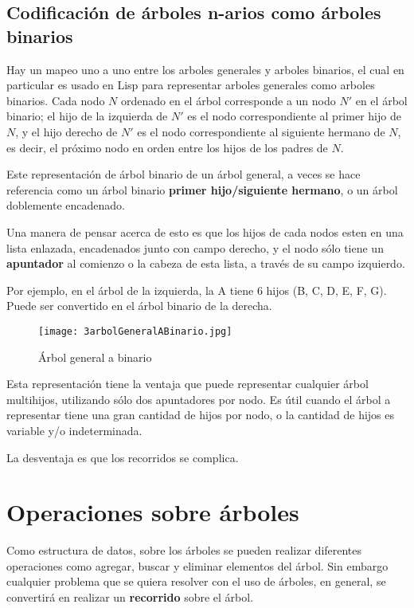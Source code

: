 \subsection{Codificación de árboles n-arios como árboles binarios}
\label{sec:codif-de-arbol}
Hay un mapeo uno a uno entre los arboles generales y arboles binarios,
el cual en particular es usado en Lisp para representar arboles
generales como arboles binarios. Cada nodo $N$ ordenado en el árbol
corresponde a un nodo $N'$ en el árbol binario; el hijo de la
izquierda de $N'$ es el nodo correspondiente al primer hijo de $N$, y
el hijo derecho de $N'$ es el nodo correspondiente al siguiente
hermano de $N$, es decir, el próximo nodo en orden entre los hijos de
los padres de $N$.

Este representación de árbol binario de un árbol general, a veces se
hace referencia como un árbol binario \textbf{primer hijo/siguiente hermano}, o
un árbol doblemente encadenado.

Una manera de pensar acerca de esto es que los hijos de cada nodos
esten en una lista enlazada, encadenados junto con campo derecho, y el
nodo sólo tiene un \textbf{apuntador} al comienzo o la cabeza de esta
lista, a través de su campo izquierdo.

Por ejemplo, en el árbol de la izquierda, la A tiene 6 hijos (B, C, D,
E, F, G). Puede ser convertido en el árbol binario de la derecha.
\begin{figure}[H]
  \centering
  \texttt{[image: 3arbolGeneralABinario.jpg]}
  \caption{Árbol general a binario}
  \label{fig:3arbolGeneralABinario}
\end{figure}

Esta representación tiene la ventaja que puede representar cualquier
árbol multihijos, utilizando sólo dos apuntadores por nodo.  Es útil
cuando el árbol a representar tiene una gran cantidad de hijos por
nodo, o la cantidad de hijos es variable y/o indeterminada.

La desventaja es que los recorridos se complica.

\section{Operaciones sobre árboles}
\label{sec:oper-sobre-arbol}

Como estructura de datos, sobre los árboles se pueden realizar
diferentes operaciones como agregar, buscar y eliminar elementos del
árbol.  Sin embargo cualquier problema que se quiera resolver con el
uso de árboles, en general, se convertirá en realizar un
\textbf{recorrido} sobre el árbol.

